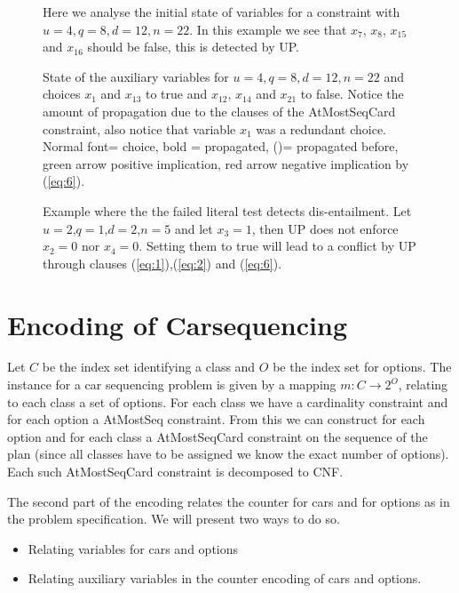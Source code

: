 \documentclass[]{llncs}
\newcommand{\AtMostSeqCard}{AtMostSeqCard }
\begin{document}
\begin{figure}
\centering 
\caption{Here we analyse the initial state of variables for a constraint
with $u=4,q=8,d=12,n=22$. In this example we see that $x_{7}$, $x_{8}$,
$x_{15}$ and $x_{16}$ should be false, this is detected by UP.}

\label{fig3}
\end{figure}

\begin{figure}
\centering 
\caption{State of the auxiliary variables for $u=4,q=8,d=12,n=22$ and
    choices $x_{1}$ and $x_{13}$ to true and $x_{12}$, $x_{14}$ and
    $x_{21}$ to false. Notice the amount of propagation due to the
    clauses of the \AtMostSeqCard constraint, also notice that variable
$x_{1}$ was a redundant choice. Normal font= choice, bold = propagated,
()= propagated before, green arrow positive implication, red arrow
negative implication by (\ref{eq:6}).}

\label{fig4}
\end{figure}                                                

\begin{figure}
\centering 
\caption{ Example where the the failed literal test detects
dis-entailment.  Let $u=2$,$q=1$,$d=2$,$n=5$ and let $x_3=1$, then UP
does not enforce $x_2=0$ nor $x_4=0$. Setting them to true will lead to
a conflict by UP through clauses (\ref{eq:1}),(\ref{eq:2}) and
(\ref{eq:6}).}

\label{ex:5}
\end{figure}

\section{Encoding of Carsequencing}


Let $C$ be the index set identifying a class and $O$ be the index set
for options. The instance for a car sequencing problem is given by a
mapping $m : C\rightarrow 2^O$, relating to each class a set of options.
For each class we have a cardinality constraint and for each option a
AtMostSeq constraint. From this we can construct for each option and for
each class a \AtMostSeqCard constraint on the sequence of the plan
(since all classes have to be assigned we know the exact number of
options).  Each such \AtMostSeqCard constraint is decomposed to CNF. 

The second part of the encoding relates the counter for cars and for
options as in the problem specification.  We will present two ways to do
so. 

\begin{itemize}
    \item Relating variables for cars and options
    \item Relating auxiliary variables in the counter encoding of cars
        and options. 
\end{itemize}
\end{document}
